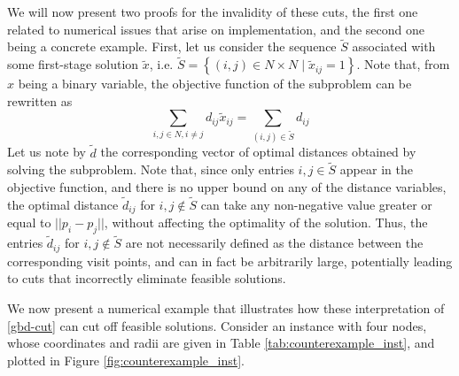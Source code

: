 \documentclass[pdflatex,sn-mathphys-num]{sn-jnl}%
\begin{document}
We will now present two proofs for the invalidity of these cuts, the first one related to numerical issues that arise on implementation, and the second one being a concrete example. First, let us consider the sequence $\tilde{S}$ associated with some first-stage solution $\tilde{x}$, i.e. $\tilde{S} = \left\{(i,j) \in N \times N \mid \tilde{x}_{ij} = 1\right\}$. Note that, from $x$ being a binary variable, the objective function of the subproblem can be rewritten as
\begin{equation}
    \sum_{i,j \in N, i \neq j} d_{ij} \tilde{x}_{ij} = \sum_{(i,j) \in \tilde{S}} d_{ij}
\end{equation}
Let us note by $\tilde{d}$ the corresponding vector of optimal distances obtained by solving the subproblem. Note that, since only entries $i,j \in \tilde{S}$ appear in the objective function, and there is no upper bound on any of the distance variables, the optimal distance $\tilde{d}_{ij}$ for $i,j \notin \tilde{S}$ can take any non-negative value greater or equal to $||p_i - p_j||$, without affecting the optimality of the solution. Thus, the entries $\tilde{d}_{ij}$ for $i,j \notin \tilde{S}$ are not necessarily defined as the distance between the corresponding visit points, and can in fact be arbitrarily large, potentially leading to cuts that incorrectly eliminate feasible solutions.

We now present a numerical example that illustrates how these interpretation of \eqref{gbd-cut} can cut off feasible solutions. Consider an instance with four nodes, whose coordinates and radii are given in Table \ref{tab:counterexample_inst}, and plotted in Figure \ref{fig:counterexample_inst}.
\end{document}
